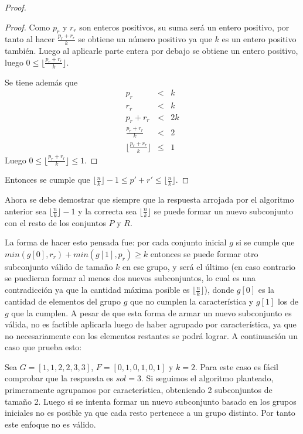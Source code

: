 \documentclass{article}
\begin{document}
\begin{proof}
    \begin{proof}
        Como $p_r$ y $r_r$ son enteros positivos, su suma será un entero positivo, por tanto al hacer
        $\frac{p_r + r_r}{k}$ se obtiene un número positivo ya que $k$ es un entero positivo también. 
        Luego al aplicarle parte entera por debajo se obtiene un entero positivo, luego 
        $0 \leq \lfloor\frac{p_r+r_r}{k}\rfloor$.

        Se tiene además que 
        \begin{eqnarray*}
            p_r &<& k\\
            r_r &<& k\\
            p_r + r_r &<& 2k\\
            \frac{p_r+r_r}{k} &<& 2\\
            \lfloor \frac{p_r+r_r}{k} \rfloor &\leq& 1
        \end{eqnarray*}
        Luego $0 \leq \lfloor \frac{p_r + r_r}{k} \rfloor \leq 1$.
    \end{proof}
    Entonces se cumple que $\lfloor \frac{n}{k} \rfloor - 1 \leq p' + r' \leq \lfloor \frac{n}{k} \rfloor$.
\end{proof}

Ahora se debe demostrar que siempre que la respuesta arrojada por el algoritmo anterior
sea $\lfloor \frac{n}{k} \rfloor - 1$ y la correcta sea $\lfloor \frac{n}{k} \rfloor$ se puede 
formar un nuevo subconjunto con el resto de los conjuntos $P$ y $R$.

La forma de hacer esto pensada fue: por cada conjunto inicial $g$ si se cumple que 
$min(g[0], r_r) + min(g[1], p_r) \geq k$ entonces se puede formar otro subconjunto válido de tamaño
$k$ en ese grupo, y será el último (en caso contrario se puedieran formar al menos dos nuevos subconjuntos, 
lo cual es una contradicción ya que la cantidad máxima posible es $\lfloor \frac{n}{k} \rfloor$), 
donde $g[0]$ es la cantidad de elementos del grupo $g$ que no cumplen la característica 
y $g[1]$ los de $g$ que la cumplen. A pesar de que esta forma de armar un nuevo subconjunto es válida, no es 
factible aplicarla luego de haber agrupado por característica, ya que no necesariamente con los elementos 
restantes se podrá lograr. A continuación un caso que prueba esto:

Sea $G = [1,1,2,2,3,3]$, $F = [0,1,0,1,0,1]$ y $k = 2$. Para este caso es fácil comprobar que la respuesta 
es $sol = 3$. Si seguimos el algoritmo planteado, primeramente agrupamos por característica, obteniendo 2 
subconjuntos de tamaño 2. Luego si se intenta formar un nuevo subconjunto basado en los grupos iniciales no 
es posible ya que cada resto pertenece a un grupo distinto. Por tanto este enfoque no es válido. 
\newpage
\end{document}
